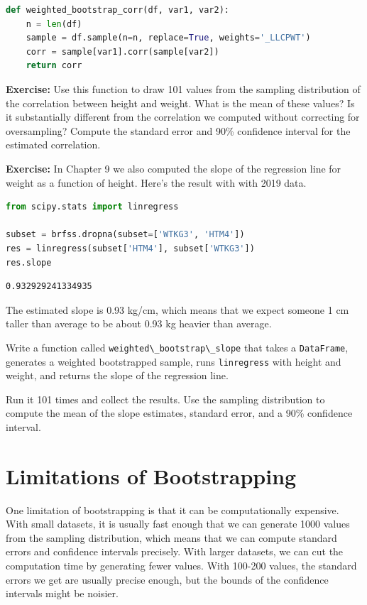 \begin{lstlisting}[language=Python,style=source]
def weighted_bootstrap_corr(df, var1, var2):
    n = len(df)
    sample = df.sample(n=n, replace=True, weights='_LLCPWT')
    corr = sample[var1].corr(sample[var2])
    return corr
\end{lstlisting}

\textbf{Exercise:} Use this function to draw 101 values from the
sampling distribution of the correlation between height and weight. What
is the mean of these values? Is it substantially different from the
correlation we computed without correcting for oversampling? Compute the
standard error and 90\% confidence interval for the estimated
correlation.

\textbf{Exercise:} In Chapter 9 we also computed the slope of the
regression line for weight as a function of height. Here's the result
with with 2019 data.

\begin{lstlisting}[language=Python,style=source]
from scipy.stats import linregress

subset = brfss.dropna(subset=['WTKG3', 'HTM4'])
res = linregress(subset['HTM4'], subset['WTKG3'])
res.slope
\end{lstlisting}

\begin{lstlisting}[style=output]
0.932929241334935
\end{lstlisting}

The estimated slope is 0.93 kg/cm, which means that we expect someone 1
cm taller than average to be about 0.93 kg heavier than average.

Write a function called
\passthrough{\lstinline!weighted\_bootstrap\_slope!} that takes a
\passthrough{\lstinline!DataFrame!}, generates a weighted bootstrapped
sample, runs \passthrough{\lstinline!linregress!} with height and
weight, and returns the slope of the regression line.

Run it 101 times and collect the results. Use the sampling distribution
to compute the mean of the slope estimates, standard error, and a 90\%
confidence interval.

\hypertarget{limitations-of-bootstrapping}{%
\section{Limitations of
Bootstrapping}\label{limitations-of-bootstrapping}}

One limitation of bootstrapping is that it can be computationally
expensive. With small datasets, it is usually fast enough that we can
generate 1000 values from the sampling distribution, which means that we
can compute standard errors and confidence intervals precisely. With
larger datasets, we can cut the computation time by generating fewer
values. With 100-200 values, the standard errors we get are usually
precise enough, but the bounds of the confidence intervals might be
noisier.

